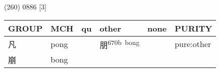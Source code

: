 \documentclass[14pt,a4paper]{scrartcl}
\begin{document}
(260) 0886 {[}3{]}

\begin{longtable}[c]{@{}llllll@{}}
\toprule
\begin{minipage}[b]{0.14\columnwidth}\raggedright\strut
GROUP
\strut\end{minipage} &
\begin{minipage}[b]{0.14\columnwidth}\raggedright\strut
MCH
\strut\end{minipage} &
\begin{minipage}[b]{0.14\columnwidth}\raggedright\strut
qu
\strut\end{minipage} &
\begin{minipage}[b]{0.14\columnwidth}\raggedright\strut
other
\strut\end{minipage} &
\begin{minipage}[b]{0.14\columnwidth}\raggedright\strut
none
\strut\end{minipage} &
\begin{minipage}[b]{0.14\columnwidth}\raggedright\strut
PURITY
\strut\end{minipage}\tabularnewline
\midrule
\endhead
\begin{minipage}[t]{0.14\columnwidth}\raggedright\strut
凡
\strut\end{minipage} &
\begin{minipage}[t]{0.14\columnwidth}\raggedright\strut
pong
\strut\end{minipage} &
\begin{minipage}[t]{0.14\columnwidth}\raggedright\strut
\strut\end{minipage} &
\begin{minipage}[t]{0.14\columnwidth}\raggedright\strut
朋\textsuperscript{670b~bong}
\strut\end{minipage} &
\begin{minipage}[t]{0.14\columnwidth}\raggedright\strut
\strut\end{minipage} &
\begin{minipage}[t]{0.14\columnwidth}\raggedright\strut
pure:other
\strut\end{minipage}\tabularnewline
\begin{minipage}[t]{0.14\columnwidth}\raggedright\strut
崩
\strut\end{minipage} &
\begin{minipage}[t]{0.14\columnwidth}\raggedright\strut
bong
\strut\end{minipage} &
\begin{minipage}[t]{0.14\columnwidth}\raggedright\strut
\strut\end{minipage} &

\end{longtable}
\end{document}
